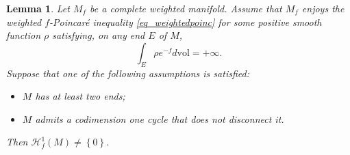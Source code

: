 \documentclass[11pt, leqno]{amsart}
\newtheorem{lemma}[theorem]{Lemma}
\begin{document}
\begin{lemma}\label{nontrivialfharmonic1forms}
Let $M_f$ be a complete weighted manifold. Assume that $M_f$ enjoys the weighted $f$-Poincar\'e inequality \eqref{eq_weightedpoinc} for some positive smooth function $\rho$ satisfying, on any end $E$ of $M$,
\begin{equation*}
\int_{E}\rho e^{-f}d\mathrm{vol}=+\infty.
\end{equation*}
Suppose that one of the following assumptions is satisfied:
\begin{itemize}
    \item[(i)] $M$ has at least two ends;
   \item[(ii)] $M$ admits a codimension one cycle that does not disconnect it.
\end{itemize}
Then $\mathcal{H}^{1}_{f}(M)\neq \left\{0\right\}$.
\end{lemma}
\end{document}
